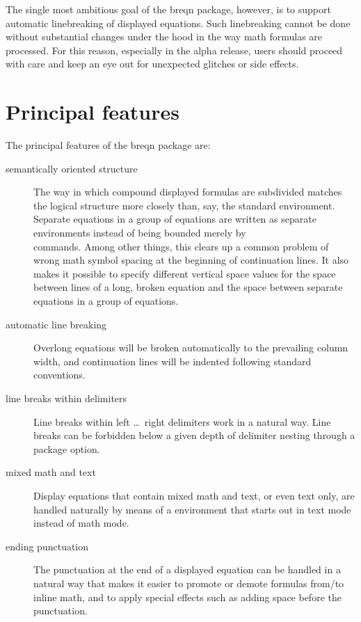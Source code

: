 \documentclass{article}
\newcommand{\ntt}{\normalfont\ttfamily}
\DeclareRobustCommand{\cs}[1]{{\ntt\ttbackslash#1}}
\let\cn=\cs
\DeclareRobustCommand{\pkg}[1]{{\ntt#1}}
\newcommand\dbslash[1]{\texttt{\string\\}}
\begin{document}
The single most ambitious goal of the \pkg{breqn} package, however, is
to support automatic linebreaking of displayed equations. Such
linebreaking cannot be done without substantial changes under the hood
in the way math formulas are processed. For this reason, especially in
the alpha release, users should proceed with care and keep an eye out
for unexpected glitches or side effects.

\section{Principal features}
The principal features of the \pkg{breqn} package are:
\begin{description}

\item[semantically oriented structure] The way in which compound
displayed formulas are subdivided matches the logical structure more
closely than, say, the standard  environment. Separate
equations in a group of equations are written as separate environments
instead of being bounded merely by \dbslash/ commands. Among other
things, this clears up a common problem of wrong math symbol spacing at
the beginning of continuation lines. It also makes it possible to
specify different vertical space values for the space between lines of a
long, broken equation and the space between separate equations in a
group of equations.

\item[automatic line breaking] Overlong equations will be broken
automatically to the prevailing column width, and continuation lines
will be indented following standard conventions.

\item[line breaks within delimiters] Line breaks within \cn{left} \dots\
\cn{right} delimiters work in a natural way. Line breaks can be
forbidden below a given depth of delimiter nesting through a package
option.

\item[mixed math and text] Display equations that contain mixed
math and text, or even text only, are handled naturally by means of a
\env{dseries} environment that starts out in text mode instead of math
mode.

\item[ending punctuation] The punctuation at the end of a displayed
equation can be handled in a natural way that makes it easier to promote
or demote formulas from\slash to inline math, and to apply special
effects such as adding space before the punctuation.


\end{description}
\end{document}
